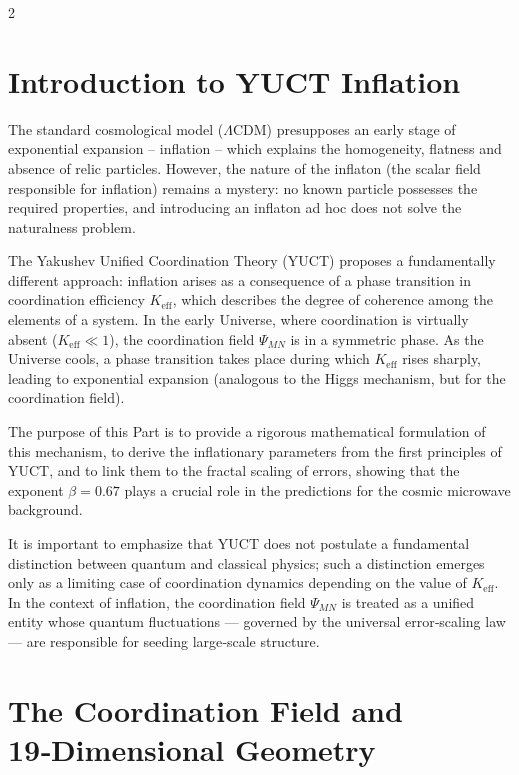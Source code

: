 \documentclass[12pt,a4paper]{article}
\newcommand{\Keff}{K_{\mathrm{eff}}}
\begin{document}
	\begin{multicols}{2}
		
		\section{Introduction to YUCT Inflation}
		\label{sec:intro-inflation}
		
		The standard cosmological model (\(\Lambda\)CDM) presupposes an early stage of exponential expansion – inflation – which explains the homogeneity, flatness and absence of relic particles. However, the nature of the inflaton (the scalar field responsible for inflation) remains a mystery: no known particle possesses the required properties, and introducing an inflaton ad hoc does not solve the naturalness problem.
		
		The Yakushev Unified Coordination Theory (YUCT) proposes a fundamentally different approach: inflation arises as a consequence of a phase transition in coordination efficiency \(\Keff\), which describes the degree of coherence among the elements of a system. In the early Universe, where coordination is virtually absent (\(\Keff \ll 1\)), the coordination field \(\Psi_{MN}\) is in a symmetric phase. As the Universe cools, a phase transition takes place during which \(\Keff\) rises sharply, leading to exponential expansion (analogous to the Higgs mechanism, but for the coordination field).
		
		The purpose of this Part is to provide a rigorous mathematical formulation of this mechanism, to derive the inflationary parameters from the first principles of YUCT, and to link them to the fractal scaling of errors, showing that the exponent \(\beta = 0.67\) plays a crucial role in the predictions for the cosmic microwave background.
		
		It is important to emphasize that YUCT does not postulate a fundamental distinction between quantum and classical physics; such a distinction emerges only as a limiting case of coordination dynamics depending on the value of \(K_{\mathrm{eff}}\). In the context of inflation, the coordination field \(\Psi_{MN}\) is treated as a unified entity whose quantum fluctuations — governed by the universal error‑scaling law — are responsible for seeding large‑scale structure.
		
		\section{The Coordination Field and 19‑Dimensional Geometry}
		\label{sec:field}
		

\end{multicols}
\end{document}
